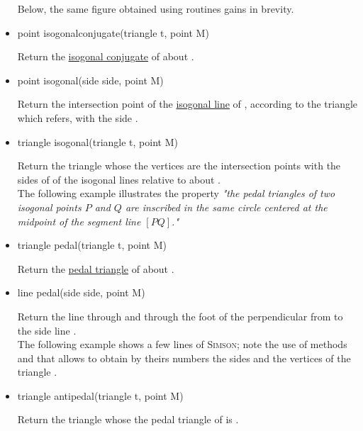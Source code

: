 \documentclass[pdftex]{article}
\begin{document}
\begin{itemize}
  Below, the same figure obtained using routines  gains
  in brevity.
\item {}
  \begin{Vcolor}
    point isogonalconjugate(triangle t, point M)
  \end{Vcolor}
  Return the
  \href{http://en.wikipedia.org/wiki/Isogonal_conjugate}{isogonal
    conjugate} of  about .
\item {}
  \begin{Vcolor}
    point isogonal(side side, point M)
  \end{Vcolor}
  Return the intersection point of the
  \href{http://mathworld.wolfram.com/IsogonalLine.html}{isogonal line}
  of , according to the triangle which  refers, with the
  side .
\item {}
  \begin{Vcolor}
    triangle isogonal(triangle t, point M)
  \end{Vcolor}
  Return the triangle whose the vertices are the intersection points
  with the sides of  of the isogonal lines relative
  to  about .\\
  The following example illustrates the property \emph{"the pedal triangles
  of two isogonal points $P$ and $Q$ are inscribed in the same circle
  centered at the midpoint of the segment line $[PQ]$."}
\item {}
  \begin{Vcolor}
    triangle pedal(triangle t, point M)
  \end{Vcolor}
  Return the
  \href{http://mathworld.wolfram.com/PedalTriangle.html}{pedal triangle} of  about .
\item {}
  \begin{Vcolor}
    line pedal(side side, point M)
  \end{Vcolor}
  Return the line through  and through the foot of the
  perpendicular from  to the side line  .\\
  The following example shows a few lines of \textsc{Simson}; note
  the use of methods  and  that
  allows to obtain by theirs numbers the sides and the vertices of the triangle
  .
\item {}
  \begin{Vcolor}
    triangle antipedal(triangle t, point M)
  \end{Vcolor}
  Return the triangle whose the pedal triangle of  is .
\end{itemize}
\end{document}
